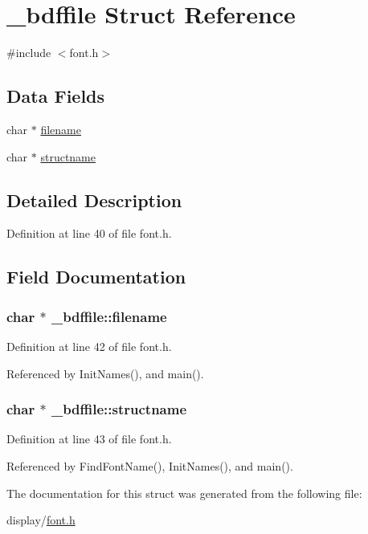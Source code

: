 \hypertarget{struct__bdffile}{\section{\-\_\-bdffile Struct Reference}
\label{struct__bdffile}
}


{\ttfamily \#include $<$font.\-h$>$}

\subsection*{Data Fields}
\begin{DoxyCompactItemize}
\item 
char $\ast$ \hyperlink{struct__bdffile_a040674bb1df0a8d4b1bedeae616e9b65}{filename}
\item 
char $\ast$ \hyperlink{struct__bdffile_a54e6c69f33cc656848ad924faba85b53}{structname}
\end{DoxyCompactItemize}


\subsection{Detailed Description}


Definition at line 40 of file font.\-h.



\subsection{Field Documentation}
\hypertarget{struct__bdffile_a040674bb1df0a8d4b1bedeae616e9b65}{
\subsubsection[{filename}]{\setlength{\rightskip}{0pt plus 5cm}char $\ast$ \-\_\-bdffile\-::filename}}\label{struct__bdffile_a040674bb1df0a8d4b1bedeae616e9b65}


Definition at line 42 of file font.\-h.



Referenced by Init\-Names(), and main().

\hypertarget{struct__bdffile_a54e6c69f33cc656848ad924faba85b53}{
\subsubsection[{structname}]{\setlength{\rightskip}{0pt plus 5cm}char $\ast$ \-\_\-bdffile\-::structname}}\label{struct__bdffile_a54e6c69f33cc656848ad924faba85b53}


Definition at line 43 of file font.\-h.



Referenced by Find\-Font\-Name(), Init\-Names(), and main().



The documentation for this struct was generated from the following file\-:\begin{DoxyCompactItemize}
\item 
display/\hyperlink{display_2font_8h}{font.\-h}\end{DoxyCompactItemize}
